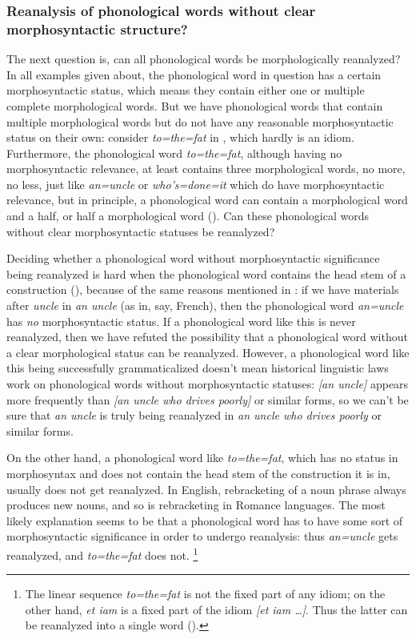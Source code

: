 \documentclass[a4paper, oneside, scheme=plain, 12pt]{article}
\newcommand{\form}[1]{\emph{#1}}
\begin{document}
\subsubsection{Reanalysis of phonological words without clear morphosyntactic structure?}\label{sec:reanalysis-without-grammar}

The next question is, can all phonological words be morphologically reanalyzed?
In all examples given about, the phonological word in question has a certain morphosyntactic status,
which means they contain either one or multiple complete morphological words.
But we have phonological words that contain multiple morphological words but do not have any reasonable morphosyntactic status on their own:
consider \form{to=the=fat} in , which hardly is an idiom.
Furthermore, the phonological word \form{to=the=fat},
although having no morphosyntactic relevance, at least contains three morphological words, no more, no less,
just like \form{an=uncle} or \form{who's=done=it} which do have morphosyntactic relevance,
but in principle, a phonological word can contain a morphological word and a half, or half a morphological word
().
Can these phonological words without clear morphosyntactic statuses be reanalyzed?

Deciding whether a phonological word without morphosyntactic significance being reanalyzed is hard
when the phonological word contains the head stem of a construction (),
because of the same reasons mentioned in :
if we have materials after \form{uncle} in \form{an uncle} (as in, say, French),
then the phonological word \form{an=uncle} has \emph{no} morphosyntactic status.
If a phonological word like this is never reanalyzed,
then we have refuted the possibility that a phonological word without a clear morphological status can be reanalyzed.
However, a phonological word like this being successfully grammaticalized
doesn't mean historical linguistic laws work on phonological words without morphosyntactic statuses:
\form{[an uncle]} appears more frequently than \form{[an uncle who drives poorly]} or similar forms,
so we can't be sure that \form{an uncle} is truly being reanalyzed in \form{an uncle who drives poorly} or similar forms.

On the other hand, a phonological word like \form{to=the=fat}, which has no status in morphosyntax
and does not contain the head stem of the construction it is in,
usually does not get reanalyzed.
In English, rebracketing of a noun phrase always produces new nouns,
and so is rebracketing in Romance languages.
The most likely explanation seems to be that
a phonological word has to have some sort of morphosyntactic significance in order to undergo reanalysis:
thus \form{an=uncle} gets reanalyzed, and \form{to=the=fat} does not.%
\footnote{
    The linear sequence \form{to=the=fat} is not the fixed part of any idiom;
    on the other hand, \form{et iam} is a fixed part of the idiom \form{[et iam \dots]}.
    Thus the latter can be reanalyzed into a single word ().
}
\end{document}
